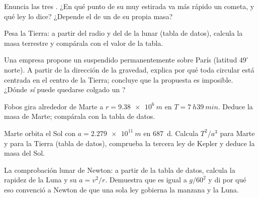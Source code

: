 \begin{exercise}[$\star$]\label{exo:g12:satellites-kepler:5}
Enuncia las tres . ¿En qué punto de su  muy estirada va más
rápido un cometa, y qué ley lo dice? ¿Depende el  de un  de su propia
masa?
\end{exercise}

\begin{exercise}[$\star\star$]\label{exo:g12:satellites-kepler:6}
Pesa la Tierra: a partir del radio y del  de la  lunar (tabla de datos),
calcula la masa terrestre y compárala con el valor de la tabla.
\end{exercise}

\begin{exercise}[$\star\star$]\label{exo:g12:satellites-kepler:7}
Una empresa propone un  suspendido permanentemente sobre París (latitud
$49^\circ$ norte). A partir de la dirección de la gravedad, explica por qué toda
 circular está centrada en el centro de la Tierra; concluye que la propuesta es
imposible. ¿Dónde \emph{sí} puede quedarse colgado un ?
\end{exercise}

\begin{exercise}[$\star\star$]\label{exo:g12:satellites-kepler:8}
Fobos gira alrededor de Marte a $r = \qty{9.38e6}{m}$ en $T = \qty{7}{h}
\qty{39}{min}$. Deduce la masa de Marte; compárala con la tabla de datos.
\end{exercise}

\begin{exercise}[$\star\star$]\label{exo:g12:satellites-kepler:9}
Marte orbita el Sol con $a = \qty{2.279e11}{m}$ en \qty{687}{d}. Calcula $T^2/a^3$
para Marte y para la Tierra (tabla de datos), comprueba la tercera ley de Kepler y
deduce la masa del Sol.
\end{exercise}

\begin{exercise}[$\star\star$]\label{exo:g12:satellites-kepler:10}
La comprobación lunar de Newton: a partir de la tabla de datos, calcula la rapidez de
la Luna y su  $a = v^2/r$. Demuestra que es igual a $g/60^2$ y
di por qué eso convenció a Newton de que una sola ley gobierna la manzana y la Luna.
\end{exercise}

